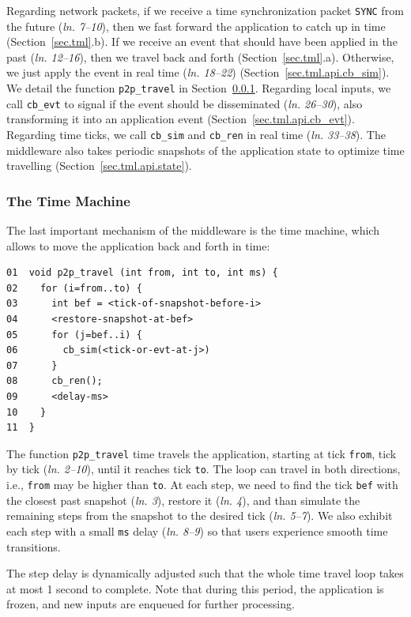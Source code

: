 \documentclass[fleqn,10pt]{SelfArx}
\newcommand{\code}[1]  {\texttt{\footnotesize{#1}}}
\newcommand{\lin}[1]{(\emph{ln. #1}\xspace)}
\begin{document}
Regarding network packets, if we receive a time synchronization packet
\code{SYNC} from the future \lin{7--10}, then we fast forward the application
to catch up in time (Section~\ref{sec.tml}.b).
If we receive an event that should have been applied in the past \lin{12--16},
then we travel back and forth (Section~\ref{sec.tml}.a).
Otherwise, we just apply the event in real time \lin{18--22}
(Section~\ref{sec.tml.api.cb_sim}).
We detail the function \code{p2p\_travel} in
Section~\ref{sec.tml.middleware.travel}.
%
Regarding local inputs, we call \code{cb\_evt} to signal if the event should be
disseminated \lin{26--30}, also transforming it into an application event
(Section~\ref{sec.tml.api.cb_evt}).
%
Regarding time ticks, we call \code{cb\_sim} and \code{cb\_ren} in real time
\lin{33--38}.
The middleware also takes periodic snapshots of the application state to
optimize time travelling (Section~\ref{sec.tml.api.state}).

\subsubsection{The Time Machine}
\label{sec.tml.middleware.travel}

The last important mechanism of the middleware is the time machine, which
allows to move the application back and forth in time:

{\footnotesize
\begin{verbatim}
01  void p2p_travel (int from, int to, int ms) {
02    for (i=from..to) {
03      int bef = <tick-of-snapshot-before-i>
04      <restore-snapshot-at-bef>
05      for (j=bef..i) {
06        cb_sim(<tick-or-evt-at-j>)
07      }
08      cb_ren();
09      <delay-ms>
10    }
11  }
\end{verbatim}
}

The function \code{p2p\_travel} time travels the application, starting at tick
\code{from}, tick by tick \lin{2--10}, until it reaches tick \code{to}.
The loop can travel in both directions, i.e., \code{from} may be higher than
\code{to}.
At each step, we need to find the tick \code{bef} with the closest past
snapshot \lin{3}, restore it \lin{4}, and than simulate the remaining steps
from the snapshot to the desired tick \lin{5--7}.
We also exhibit each step with a small \code{ms} delay \lin{8--9} so that users
experience smooth time transitions.

The step delay is dynamically adjusted such that the whole time travel loop
takes at most 1 second to complete.
Note that during this period, the application is frozen, and new inputs are
enqueued for further processing.
\end{document}
